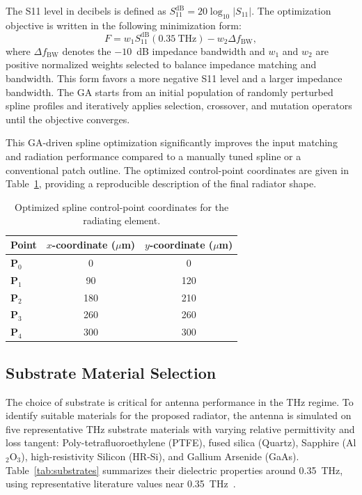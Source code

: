 \documentclass[draft]{agujournal2019}
\begin{document}
The S11 level in decibels is defined as $S_{11}^{\mathrm{dB}}=20\log_{10}\lvert S_{11}\rvert$. The optimization objective is written in the following minimization form:
\[
F = w_1 S_{11}^{\mathrm{dB}}(0.35~\text{THz}) - w_2 \Delta f_{\text{BW}},
\]
where $\Delta f_{\text{BW}}$ denotes the \(-10\)~dB impedance bandwidth and $w_1$ and $w_2$ are positive normalized weights selected to balance impedance matching and bandwidth. This form favors a more negative S11 level and a larger impedance bandwidth. The GA starts from an initial population of randomly perturbed spline profiles and iteratively applies selection, crossover, and mutation operators until the objective converges.

This GA-driven spline optimization significantly improves the input matching and radiation performance compared to a manually tuned spline or a conventional patch outline. The optimized control-point coordinates are given in Table~\ref{tab:spline_points}, providing a reproducible description of the final radiator shape.

\begin{table}[ht]
\centering
\caption{Optimized spline control-point coordinates for the radiating element.}
\label{tab:spline_points}
\begin{tabular}{@{}lcc@{}}
\toprule
\textbf{Point} & \textbf{$x$-coordinate ($\mu$m)} & \textbf{$y$-coordinate ($\mu$m)} \\
\midrule
$\mathbf{P}_0$ & 0   & 0   \\
$\mathbf{P}_1$ & 90  & 120 \\
$\mathbf{P}_2$ & 180 & 210 \\
$\mathbf{P}_3$ & 260 & 260 \\
$\mathbf{P}_4$ & 300 & 300 \\
\bottomrule
\end{tabular}
\end{table}

\subsection{Substrate Material Selection}
\label{subsec:substrate}

The choice of substrate is critical for antenna performance in the THz regime. To identify suitable materials for the proposed radiator, the antenna is simulated on five representative THz substrate materials with varying relative permittivity and loss tangent: Poly-tetrafluoroethylene (PTFE), fused silica (Quartz), Sapphire (Al$_2$O$_3$), high-resistivity Silicon (HR-Si), and Gallium Arsenide (GaAs). Table~\ref{tab:substrates} summarizes their dielectric properties around 0.35~THz, using representative literature values near 0.35~THz~\cite{hajiyat_antenna_2021}.
\end{document}
